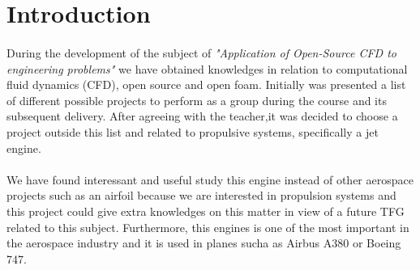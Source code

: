 \section{Introduction}

\paragraph{}
During the development of the subject of \textit{"Application of Open-Source CFD to engineering problems"} we have obtained knowledges in relation to computational fluid dynamics (CFD), open source and open foam. Initially was presented a list of different possible projects to perform as a group during the course and its subsequent delivery. After agreeing with the teacher,it was decided to choose a project outside this list and related to propulsive systems, specifically a jet engine. 

\paragraph{}
We have found interessant and useful  study this engine instead of other aerospace projects such as an airfoil because we are interested in propulsion systems and this project could give extra knowledges on this matter in view of a future TFG related to this subject. Furthermore, this engines is one of the most important  in the aerospace industry and it is used in planes sucha as Airbus A380 or Boeing 747.